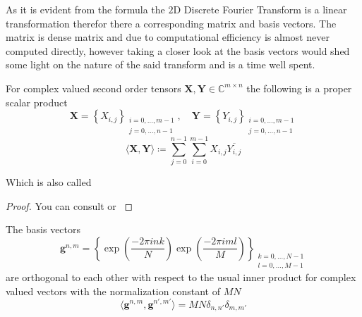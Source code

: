 As it is evident from the formula the $2$D Discrete Fourier Transform is a linear transformation therefor 
there a corresponding matrix and basis vectors. The matrix is dense matrix and due to computational efficiency 
is almost never computed directly, however taking a closer look at the basis vectors would shed some light on 
the nature of the said transform and is a time well spent.



\begin{Prop}
    For complex valued second order tensors $\boldsymbol{X},\boldsymbol{Y} \in \mathbb{C}^{m \times n}$ the following is a proper scalar product
    \begin{equation*}
        \boldsymbol{X} = \left\{X_{i,j}\right\}_{\substack{i=0,\ldots,m-1\\ j=0,\ldots,n-1}}, \quad \boldsymbol{Y} = \left\{Y_{i,j}\right\}_{\substack{i=0,\ldots,m-1\\ j=0,\ldots,n-1}}
    \end{equation*}
    \begin{equation*}
        \langle\boldsymbol{X},\boldsymbol{Y}\rangle \coloneqq \sum_{j=0}^{n-1}\sum_{i=0}^{m-1} X_{i,j} \overline{Y_{i,j}} 
    \end{equation*}
\end{Prop}

Which is also called 

\begin{proof}
    You can consult \cite{wavelets_linear_algebra} or \cite{matrix_analysis_horn} \cite{numerical_tensor_hackbusch}
\end{proof}

\begin{Prop}\label{Prop:2ddftbasisvectors}
    The basis vectors
    \begin{equation}\label{eq:2ddftbasisvectors}
        \boldsymbol{g}^{n,m} = \left\{\exp\left({\frac{-2\pi ink}{N}}\right)\exp\left({\frac{-2\pi iml}{M}}\right)\right\}_{\substack{k=0,\ldots,N-1\\l=0,\ldots,M-1}}
    \end{equation}
    are orthogonal to each other with respect to the usual inner product for complex valued vectors 
    with the normalization constant of $MN$
    \begin{equation}
        \langle\boldsymbol{g}^{n,m},\boldsymbol{g}^{n',m'}\rangle= MN \delta_{n,n'}\delta_{m,m'}
    \end{equation}
\end{Prop}

